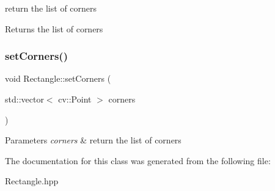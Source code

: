 return the list of corners \begin{DoxyReturn}{Returns}
the list of corners 
\end{DoxyReturn}
\mbox{\label{class_rectangle_abd4c59ad5fa7010563f2efb95c553b24}} 
\subsubsection{\texorpdfstring{set\+Corners()}{setCorners()}}
{\footnotesize\ttfamily void Rectangle\+::set\+Corners (\begin{DoxyParamCaption}\item[{std\+::vector$<$ cv\+::\+Point $>$}]{corners }\end{DoxyParamCaption})}


\begin{DoxyParams}{Parameters}
{\em corners} & return the list of corners \\
\hline
\end{DoxyParams}


The documentation for this class was generated from the following file\+:\begin{DoxyCompactItemize}
\item 
Rectangle.\+hpp\end{DoxyCompactItemize}
